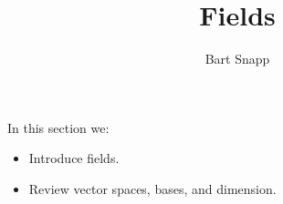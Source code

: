 \documentclass{ximera}
\author{Bart Snapp}
\title{Fields}
\begin{document}
\begin{abstract}
\end{abstract}
\maketitle
In this section we:

\begin{itemize}
\item Introduce fields.
\item Review vector spaces, bases, and dimension.
\end{itemize}
\end{document}
